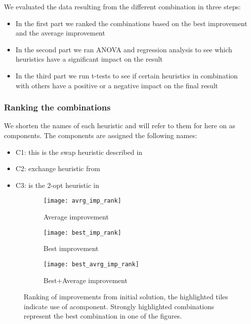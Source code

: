 \documentclass[../main.tex]{subfiles}
\begin{document}
\par We evaluated the data resulting from the different combination in three steps:
\begin{itemize}
    \item In the first part we ranked the combinations based on the best improvement and the average improvement
    \item In the second part we ran ANOVA and regression analysis to see which heuristics have a significant impact on the result
    \item In the third part we run t-tests to see if certain heuristics in combination with others have a positive or a negative impact on the final result
\end{itemize}

\subsubsection{Ranking the combinations}
We shorten the names of each heuristic and will refer to them for here on as components. The components are assigned the following names:
\begin{itemize}
    \item C1: this is the swap heuristic described in 
    \item C2: exchange heuristic from 
    \item C3: is the 2-opt heuristic in  
\end{itemize}
\begin{figure}
    \centering
    \begin{subfigure}[b]{0.95\textwidth}
        \centering
        \texttt{[image: avrg\_imp\_rank]}
        \caption{Average improvement}
        \label{fig:avrgrank}
    \end{subfigure}

    \begin{subfigure}[b]{0.95\textwidth}
        \centering
        \texttt{[image: best\_imp\_rank]}
        \caption{Best improvement}
        \label{fig:bestrank}
    \end{subfigure}

    \begin{subfigure}[b]{0.95\textwidth}
        \centering
        \texttt{[image: best\_avrg\_imp\_rank]}
        \caption{Best+Average improvement}
        \label{fig:avrgbestrank}
    \end{subfigure}
    \caption{Ranking of improvements from initial solution, the highlighted tiles indicate use of acomponent. Strongly highlighted combinations represent the best combination in one of the figures.}
    \label{fig:rank}
\end{figure}
\end{document}
